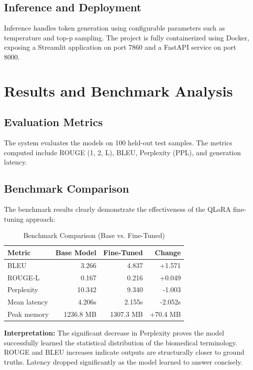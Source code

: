 \documentclass[12pt,a4paper]{report}
\begin{document}
\section{Inference and Deployment}
Inference handles token generation using configurable parameters such as temperature and top-p sampling. The project is fully containerized using Docker, exposing a Streamlit application on port 7860 and a FastAPI service on port 8000.

\chapter{Results and Benchmark Analysis}

\section{Evaluation Metrics}
The system evaluates the models on 100 held-out test samples. The metrics computed include ROUGE (1, 2, L), BLEU, Perplexity (PPL), and generation latency.

\section{Benchmark Comparison}
The benchmark results clearly demonstrate the effectiveness of the QLoRA fine-tuning approach:

\begin{table}[h]
\centering
\caption{Benchmark Comparison (Base vs. Fine-Tuned)}
\begin{tabular}{lrrr}
\toprule
\textbf{Metric} & \textbf{Base Model} & \textbf{Fine-Tuned} & \textbf{Change} \\
\midrule
BLEU & 3.266 & 4.837 & +1.571 \\
ROUGE-L & 0.167 & 0.216 & +0.049 \\
Perplexity & 10.342 & 9.340 & -1.003 \\
Mean latency & 4.206s & 2.155s & -2.052s \\
Peak memory & 1236.8 MB & 1307.3 MB & +70.4 MB \\
\bottomrule
\end{tabular}
\end{table}

\textbf{Interpretation:}
The significant decrease in Perplexity proves the model successfully learned the statistical distribution of the biomedical terminology. ROUGE and BLEU increases indicate outputs are structurally closer to ground truths. Latency dropped significantly as the model learned to answer concisely.
\end{document}
